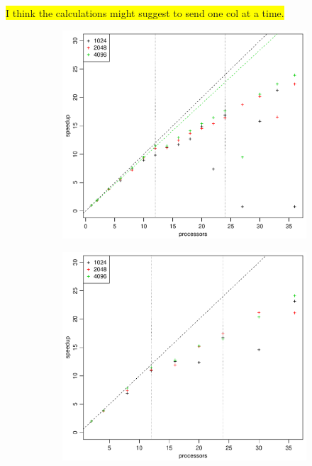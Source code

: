 \colorbox{yellow}{I think the calculations might suggest to send one col at a time.}
%
\begin{figure}[h!]
  \centering
  \begin{subfigure}[b]{0.48\textwidth}
    \includegraphics[width=\textwidth]{./Figures/taskbSpeedupProc1.pdf}
  \end{subfigure}%
  \quad
  \begin{subfigure}[b]{0.48\textwidth}
    \includegraphics[width=\textwidth]{./Figures/taskbSpeedupProc2.pdf}

\end{subfigure}
\end{figure}

